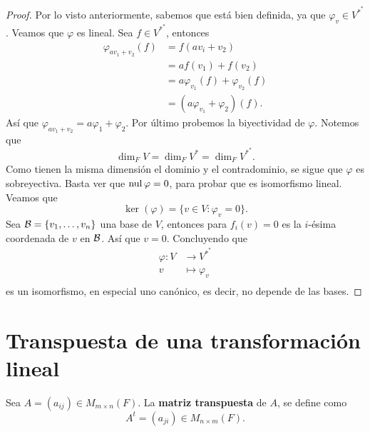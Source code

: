 \documentclass[12pt,a4paper]{book}
\newcommand{\llaves}[1]{\{#1\}}
\begin{document}
    \begin{proof}
        Por lo visto anteriormente, sabemos que está bien definida, ya que $\varphi_v \in V^{*^*}$. Veamos que $\varphi$ es lineal. Sea $f \in V^{*^*}$, entonces 
        \begin{align*}
            \varphi_{av_1 + v_2}(f) & = f(av_i + v_2)\\
            & = af(v_1) + f({v_2})\\
            & = a \varphi_{v_1}(f) + \varphi_{v_2}(f)\\
            & = (a\varphi_{v_1} + \varphi_2)(f).
        \end{align*}
        Así que $\varphi_{av_1 + v_2} = a\varphi_1 + \varphi_2$. Por último probemos la biyectividad de $\varphi$. Notemos que
        \[
        \dim_FV = \dim_FV^* = \dim_FV^{*^*}.
        \]
        Como tienen la misma dimensión el dominio y el contradominio, se sigue que $\varphi$ es sobreyectiva. Basta ver que $\operatorname{nul} \varphi = 0$, para probar que es isomorfismo lineal. Veamos que 
        \[
        \ker (\varphi) = \llaves{v \in V : \varphi_v = 0}.
        \]
        Sea $\BB = \llaves{v_1, \dots, v_n}$ una base de $V$, entonces para $f_i(v) = 0$ es la $i$-ésima coordenada de $v$ en $\mathcal{B}$. Así que $v = 0$. Concluyendo que
        \begin{align*}
        \varphi: V & \longrightarrow V^{*^*}\\
        v & \longmapsto \varphi_v\\
        \end{align*}
        es un isomorfismo, en especial uno canónico, es decir, no depende de las bases.
    \end{proof}

    \section{Transpuesta de una transformación lineal}

    \begin{definicion}
        Sea $A = (a_{ij}) \in M_{m \times n}(F)$. La \textbf{matriz transpuesta} de $A$, se define como
        \[
        A^t = (a_{ji}) \in M_{n \times m}(F).
        \]
    \end{definicion}
\end{document}
